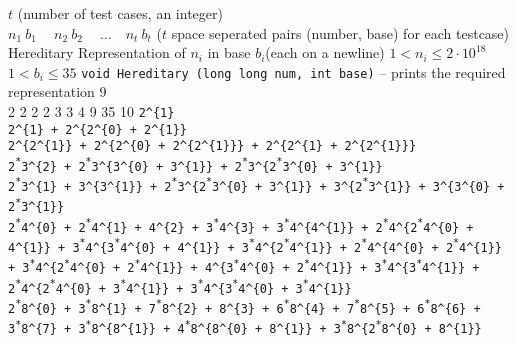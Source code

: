 \begin{testcasesFunctionMore}
	{$t$ \hfill(number of test cases, an integer)\\
	$n_1\ b_1\ \quad n_2\ b_2\ \quad \ldots\quad n_t\ b_t$ \hfill($t$ space seperated pairs (number, base) for each testcase)}
	{Hereditary Representation of $n_i$ in base $b_i$\hfill(each on a newline)}
	{$1 < n_i \leq 2 \cdot 10^{18}$\\
	$1 < b_i \leq 35$}
	{\texttt{void Hereditary (long long num, int base)} -- prints the required representation}
	{9\\2 2 2 2 3 3 4 9 35 10}
	{\texttt{2\^{}\{1\}}\\[0.7em]
\texttt{2\^{}\{1\} + 2\^{}\{2\^{}\{0\} + 2\^{}\{1\}\}}\\[0.7em]
\texttt{2\^{}\{2\^{}\{1\}\} + 2\^{}\{2\^{}\{0\} + 2\^{}\{2\^{}\{1\}\}\} + 2\^{}\{2\^{}\{1\} + 2\^{}\{2\^{}\{1\}\}\}}\\[0.7em]
\texttt{2\textsuperscript{*}3\^{}\{2\} + 2\textsuperscript{*}3\^{}\{3\^{}\{0\} + 3\^{}\{1\}\} + 2\textsuperscript{*}3\^{}\{2\textsuperscript{*}3\^{}\{0\} + 3\^{}\{1\}\}}\\[0.7em]
\texttt{2\textsuperscript{*}3\^{}\{1\} + 3\^{}\{3\^{}\{1\}\} + 2\textsuperscript{*}3\^{}\{2\textsuperscript{*}3\^{}\{0\} + 3\^{}\{1\}\} + 3\^{}\{2\textsuperscript{*}3\^{}\{1\}\} + 3\^{}\{3\^{}\{0\} + 2\textsuperscript{*}3\^{}\{1\}\}}\\[0.7em]
\texttt{2\textsuperscript{*}4\^{}\{0\} + 2\textsuperscript{*}4\^{}\{1\} + 4\^{}\{2\} + 3\textsuperscript{*}4\^{}\{3\} + 3\textsuperscript{*}4\^{}\{4\^{}\{1\}\} + 2\textsuperscript{*}4\^{}\{2\textsuperscript{*}4\^{}\{0\} + 4\^{}\{1\}\} + 3\textsuperscript{*}4\^{}\{3\textsuperscript{*}4\^{}\{0\} + 4\^{}\{1\}\} + 3\textsuperscript{*}4\^{}\{2\textsuperscript{*}4\^{}\{1\}\} + 2\textsuperscript{*}4\^{}\{4\^{}\{0\} + 2\textsuperscript{*}4\^{}\{1\}\} + 3\textsuperscript{*}4\^{}\{2\textsuperscript{*}4\^{}\{0\} + 2\textsuperscript{*}4\^{}\{1\}\} + 4\^{}\{3\textsuperscript{*}4\^{}\{0\} + 2\textsuperscript{*}4\^{}\{1\}\} + 3\textsuperscript{*}4\^{}\{3\textsuperscript{*}4\^{}\{1\}\} + 2\textsuperscript{*}4\^{}\{2\textsuperscript{*}4\^{}\{0\} + 3\textsuperscript{*}4\^{}\{1\}\} + 3\textsuperscript{*}4\^{}\{3\textsuperscript{*}4\^{}\{0\} + 3\textsuperscript{*}4\^{}\{1\}\}}\\[0.7em]
\texttt{2\textsuperscript{*}8\^{}\{0\} + 3\textsuperscript{*}8\^{}\{1\} + 7\textsuperscript{*}8\^{}\{2\} + 8\^{}\{3\} + 6\textsuperscript{*}8\^{}\{4\} + 7\textsuperscript{*}8\^{}\{5\} + 6\textsuperscript{*}8\^{}\{6\} + 3\textsuperscript{*}8\^{}\{7\} + 3\textsuperscript{*}8\^{}\{8\^{}\{1\}\} + 4\textsuperscript{*}8\^{}\{8\^{}\{0\} + 8\^{}\{1\}\} + 3\textsuperscript{*}8\^{}\{2\textsuperscript{*}8\^{}\{0\} + 8\^{}\{1\}\}}\\[0.7em]
}
\end{testcasesFunctionMore}
